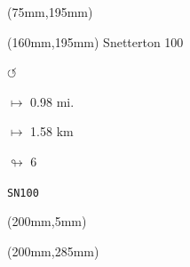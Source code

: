 \begin{textblock*}{80mm}(75mm,195mm)%
\end{textblock*}
\begin{textblock*}{40mm}(160mm,195mm)%
Snetterton 100
\par \Huge$\circlearrowleft$
\Large
\par$\mapsto$ 0.98 mi.
\par$\mapsto$ 1.58 km
\par$\looparrowright$ 6
\par\hfill\tiny\tt SN100\\
\end{textblock*}
\begin{textblock*}{20mm}(200mm,5mm)%
\fbox{\thepage}
\end{textblock*}
\begin{textblock*}{20mm}(200mm,285mm)%
\fbox{\thepage}
\end{textblock*}
\null\newpage

